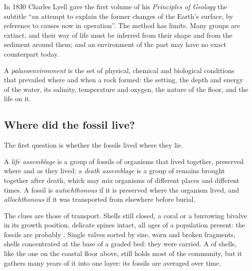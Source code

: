 In 1830 Charles Lyell gave the first volume of his \emph{Principles of Geology} the subtitle ``an
attempt to explain the former changes of the Earth's surface, by reference to causes now in
operation''. The method has limits. Many groups are extinct, and their way of life must be
inferred from their shape and from the sediment around them; and an environment of the past may
have no exact counterpart today.

\begin{definition}[Palaeoenvironment]\label{def:b2:palaeoenvironments:palaeoenvironment}
A \emph{palaeoenvironment} is the set of physical, chemical and
biological conditions that prevailed where and when a rock formed: the setting, the depth and
energy of the water, its salinity, temperature and oxygen, the nature of the floor, and the life
on it.
\end{definition}

\subsection*{Where did the fossil live?}

The first question is whether the fossils lived where they lie.

\begin{definition}\label{def:b2:palaeoenvironments:assemblages}
A \emph{life assemblage} is a group of fossils of organisms that lived
together, preserved where and as they lived; a \emph{death assemblage} is
a group of remains brought together after death, which may mix organisms of different places
and different times. A fossil is \emph{autochthonous} if it is
preserved where the organism lived, and \emph{allochthonous} if it was
transported from elsewhere before burial.
\end{definition}

The clues are those of transport. Shells still closed, a coral or a burrowing bivalve in its
growth position, delicate spines intact, all ages of a population present: the fossils are
probably . Single valves sorted by size, worn and broken fragments, shells
concentrated at the base of a graded bed: they were carried. A  of shells, like
the one on the coastal floor above, still holds most of the community, but it gathers many years
of it into one layer: its fossils are averaged over time.

